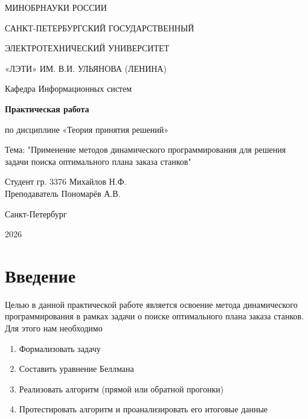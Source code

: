 \documentclass[a4paper,12pt]{article}
\begin{document}
\begin{titlepage}
    \centering
    {\large МИНОБРНАУКИ РОССИИ\par}
    \vspace{0.5em}
    {\large САНКТ-ПЕТЕРБУРГСКИЙ ГОСУДАРСТВЕННЫЙ\par}
    {\large ЭЛЕКТРОТЕХНИЧЕСКИЙ УНИВЕРСИТЕТ\par}
    {\large «ЛЭТИ» ИМ. В.И. УЛЬЯНОВА (ЛЕНИНА)\par}
    \vspace{1em}
    {\large Кафедра Информационных систем\par}

    \vspace{6em}

    {\LARGE \textbf{Практическая работа}\par}
    \vspace{0.8em}
    {\large по дисциплине «Теория принятия решений»\par}
    \vspace{0.8em}
    {\large Тема: "Применение методов динамического программирования для решения задачи поиска оптимального плана заказа станков"\par}

    \vfill

    \begin{flushleft}
        Студент гр. 3376 \hfill Михайлов Н.Ф.\\[0.5em]
        Преподаватель   \hfill Пономарёв А.В.
    \end{flushleft}

    \vspace{3em}

    Санкт-Петербург\par
    2026
\end{titlepage}

\tableofcontents
\newpage

\section{Введение}
Целью в данной практической работе является освоение метода динамического программирования
в рамках задачи о поиске оптимального плана заказа станков. \\
Для этого нам необходимо
\begin{enumerate}
    \item Формализовать задачу
    \item Составить уравнение Беллмана
    \item Реализовать алгоритм (прямой или обратной прогонки)
    \item Протестировать алгоритм и проанализировать его итоговые данные
\end{enumerate}
\end{document}
